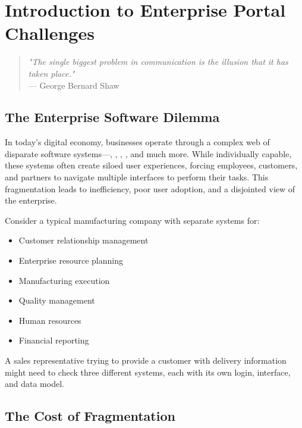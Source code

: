 
\chapter{Introduction to Enterprise Portal Challenges}
\label{chap:intro}

\begin{quote}
\textit{"The single biggest problem in communication is the illusion that it has taken place."} \\
— George Bernard Shaw
\end{quote}

\section{The Enterprise Software Dilemma}
\label{sec:enterprise-dilemma}

In today's digital economy, businesses operate through a complex web of disparate software systems—, , , , and much more. While individually capable, these systems often create siloed user experiences, forcing employees, customers, and partners to navigate multiple interfaces to perform their tasks. This fragmentation leads to inefficiency, poor user adoption, and a disjointed view of the enterprise.

\begin{examplebox}
Consider a typical manufacturing company with separate systems for:
\begin{itemize}
\item Customer relationship management
\item Enterprise resource planning  
\item Manufacturing execution
\item Quality management
\item Human resources
\item Financial reporting
\end{itemize}

A sales representative trying to provide a customer with delivery information might need to check three different systems, each with its own login, interface, and data model.
\end{examplebox}

\section{The Cost of Fragmentation}
\label{sec:cost-fragmentation}

